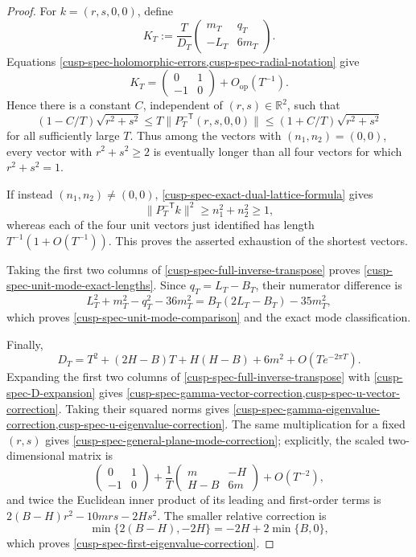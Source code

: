 \begin{proof}
For \(k=(r,s,0,0)\), define
\[
 K_T:=\frac{T}{D_T}
 \begin{pmatrix}m_T&q_T\\-L_T&6m_T\end{pmatrix}.
\]
Equations \cref{cusp-spec-holomorphic-errors,cusp-spec-radial-notation}
give
\begin{equation}
 K_T=
 \begin{pmatrix}0&1\\-1&0\end{pmatrix}+O_{\mathrm{op}}(T^{-1}).
 \label{cusp-spec-scaled-dual-plane}
\end{equation}
Hence there is a constant \(C\), independent of
\((r,s)\in\mathbb R^2\), such that
\begin{equation}
 (1-C/T)\sqrt{r^2+s^2}
 \le T\lVert P_T^{-\mathsf T}(r,s,0,0)\rVert
 \le(1+C/T)\sqrt{r^2+s^2}
 \label{cusp-spec-uniform-singular-bound}
\end{equation}
for all sufficiently large \(T\).  Thus among the vectors with
\((n_1,n_2)=(0,0)\), every vector with \(r^2+s^2\ge2\) is eventually
longer than all four vectors for which \(r^2+s^2=1\).

If instead \((n_1,n_2)\ne(0,0)\),
\cref{cusp-spec-exact-dual-lattice-formula} gives
\[
 \lVert P_T^{-\mathsf T}k\rVert^2\ge n_1^2+n_2^2\ge1,
\]
whereas each of the four unit vectors just identified has length
\(T^{-1}(1+O(T^{-1}))\).  This proves the asserted exhaustion of the
shortest vectors.

Taking the first two columns of
\cref{cusp-spec-full-inverse-transpose} proves
\cref{cusp-spec-unit-mode-exact-lengths}.  Since \(q_T=L_T-B_T\),
their numerator difference is
\[
 L_T^2+m_T^2-q_T^2-36m_T^2
 =B_T(2L_T-B_T)-35m_T^2,
\]
which proves \cref{cusp-spec-unit-mode-comparison} and the exact mode
classification.

Finally,
\begin{equation}
 D_T
 =T^2+(2H-B)T+H(H-B)+6m^2+O(Te^{-2\pi T}).
 \label{cusp-spec-D-expansion}
\end{equation}
Expanding the first two columns of
\cref{cusp-spec-full-inverse-transpose} with
\cref{cusp-spec-D-expansion} gives
\cref{cusp-spec-gamma-vector-correction,cusp-spec-u-vector-correction}.
Taking their squared norms gives
\cref{cusp-spec-gamma-eigenvalue-correction,cusp-spec-u-eigenvalue-correction}.
The same multiplication for a fixed \((r,s)\) gives
\cref{cusp-spec-general-plane-mode-correction}; explicitly, the scaled
two-dimensional matrix is
\[
 \begin{pmatrix}0&1\\-1&0\end{pmatrix}
 +\frac1T\begin{pmatrix}m&-H\\H-B&6m\end{pmatrix}
 +O(T^{-2}),
\]
and twice the Euclidean inner product of its leading and first-order terms is
\(2(B-H)r^2-10mrs-2Hs^2\).
The smaller relative correction is
\[
 \min\{2(B-H),-2H\}=-2H+2\min\{B,0\},
\]
which proves \cref{cusp-spec-first-eigenvalue-correction}.
\end{proof}

